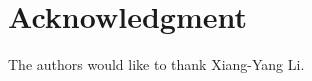 \documentclass[conference]{IEEEtran}
\begin{document}
\section*{Acknowledgment}
The authors would like to thank Xiang-Yang Li.






%
%
%
%
%





\end{document}
